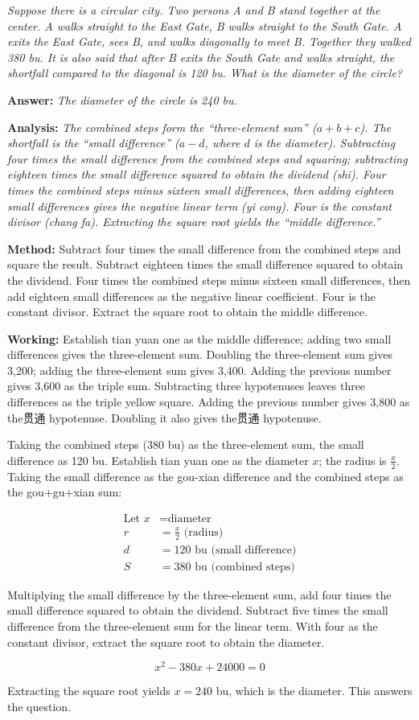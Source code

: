 \documentclass[11pt,a4paper]{book}
\newcommand{\answer}[1]{\noindent\textbf{\color{anacolor}Answer: }\textit{#1}\par}
\newcommand{\method}[1]{\noindent\textbf{\color{methodcolor}Method: }#1\par}
\newcommand{\working}[1]{\noindent\textbf{\color{workcolor}Working: }#1\par}
\newcommand{\analysis}[1]{\noindent\textbf{\color{anacolor}Analysis: }\textit{#1}\par}
\begin{document}
\textit{Suppose there is a circular city. Two persons A and B stand together at the center. A walks straight to the East Gate, B walks straight to the South Gate. A exits the East Gate, sees B, and walks diagonally to meet B. Together they walked 380 bu. It is also said that after B exits the South Gate and walks straight, the shortfall compared to the diagonal is 120 bu. What is the diameter of the circle?}

\answer{The diameter of the circle is 240 bu.}

\analysis{The combined steps form the ``three-element sum'' ($a + b + c$). The shortfall is the ``small difference'' ($a - d$, where $d$ is the diameter). Subtracting four times the small difference from the combined steps and squaring; subtracting eighteen times the small difference squared to obtain the dividend (\textit{shi}). Four times the combined steps minus sixteen small differences, then adding eighteen small differences gives the negative linear term (\textit{yi cong}). Four is the constant divisor (\textit{chang fa}). Extracting the square root yields the ``middle difference.''}

\method{Subtract four times the small difference from the combined steps and square the result. Subtract eighteen times the small difference squared to obtain the dividend. Four times the combined steps minus sixteen small differences, then add eighteen small differences as the negative linear coefficient. Four is the constant divisor. Extract the square root to obtain the middle difference.}

\working{Establish tian yuan one as the middle difference; adding two small differences gives the three-element sum. Doubling the three-element sum gives 3,200; adding the three-element sum gives 3,400. Adding the previous number gives 3,600 as the triple sum. Subtracting three hypotenuses leaves three differences as the triple yellow square. Adding the previous number gives 3,800 as the贯通 hypotenuse. Doubling it also gives the贯通 hypotenuse.

Taking the combined steps (380 bu) as the three-element sum, the small difference as 120 bu. Establish tian yuan one as the diameter $x$; the radius is $\frac{x}{2}$. Taking the small difference as the gou-xian difference and the combined steps as the gou+gu+xian sum:

\begin{align*}
\text{Let } x &= \text{diameter} \\
r &= \frac{x}{2} \text{ (radius)} \\
d &= 120 \text{ bu (small difference)} \\
S &= 380 \text{ bu (combined steps)}
\end{align*}

Multiplying the small difference by the three-element sum, add four times the small difference squared to obtain the dividend. Subtract five times the small difference from the three-element sum for the linear term. With four as the constant divisor, extract the square root to obtain the diameter.

$$x^2 - 380x + 24000 = 0$$

Extracting the square root yields $x = 240$ bu, which is the diameter. This answers the question.}
\end{document}
